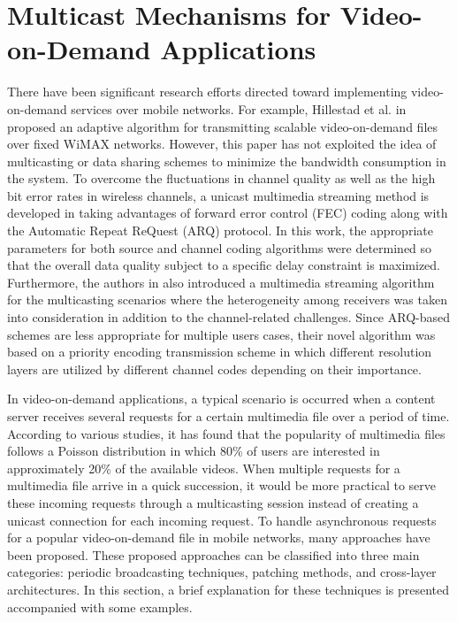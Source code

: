 \section{Multicast Mechanisms for Video-on-Demand Applications}
\label{sec:methodology}
There have been significant research efforts directed toward implementing video-on-demand services over mobile networks. For example, Hillestad et al. in \cite{ref4} proposed an adaptive algorithm for transmitting scalable video-on-demand files over fixed WiMAX networks. However, this paper has not exploited the idea of multicasting or data sharing schemes to minimize the bandwidth consumption in the system. To overcome the fluctuations in channel quality as well as the high bit error rates in wireless channels, a unicast multimedia streaming method is developed in \cite{ref5} taking advantages of forward error control (FEC) coding along with the Automatic Repeat ReQuest (ARQ) protocol. In this work, the appropriate parameters for both source and channel coding algorithms were determined so that the overall data quality subject to a specific delay constraint is maximized. Furthermore, the authors in \cite{ref5} also introduced a multimedia streaming algorithm for the multicasting scenarios where the heterogeneity among receivers was taken into consideration in addition to the channel-related challenges. Since ARQ-based schemes are less appropriate for multiple users cases, their novel algorithm was based on a priority encoding transmission scheme in which different resolution layers are utilized by different channel codes depending on their importance.

In video-on-demand applications, a typical scenario is occurred when a content server receives several requests for a certain multimedia file over a period of time. According to various studies, it has found that the popularity of multimedia files follows a Poisson distribution in which 80\% of users are interested in approximately 20\% of the available videos. When multiple requests for a multimedia file arrive in a quick succession, it would be more practical to serve these incoming requests through a multicasting session instead of creating a unicast connection for each incoming request. To handle asynchronous requests for a popular video-on-demand file in mobile networks, many approaches have been proposed. These proposed approaches can be classified into three main categories: periodic broadcasting techniques, patching methods, and cross-layer architectures. In this section, a brief explanation for these techniques is presented accompanied with some examples.


